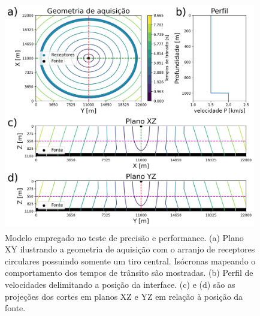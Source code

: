 \begin{figure}[H]
	\centering
	\includegraphics[width = 11cm, height = 10cm]{Imgs/RevisaoBibliografica/modelGeometry.png}
	\caption{Modelo empregado no teste de precisão e performance. (a) Plano XY ilustrando a geometria de aquisição com o arranjo de receptores circulares possuindo somente um tiro central. Isócronas mapeando o comportamento dos tempos de trânsito são mostradas. (b) Perfil de velocidades delimitando a posição da interface. (c) e (d) são as projeções dos cortes em planos XZ e YZ em relação à posição da fonte.}
	\label{fig:configurationNumericalComparison}
\end{figure}


